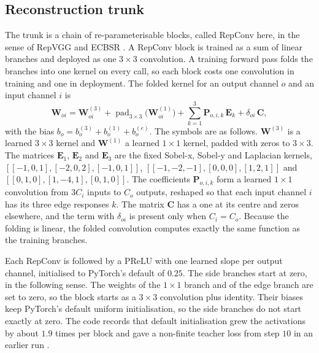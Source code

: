 \subsection{Reconstruction trunk}\label{sec:tsrm-trunk}

The trunk is a chain of re-parameterisable blocks, called RepConv here, in the sense of RepVGG \cite{ding2021repvgg} and ECBSR \cite{zhang2021ecbsr}. A RepConv block is trained as a sum of linear branches and deployed as one $3\times3$ convolution. A training forward pass folds the branches into one kernel on every call, so each block costs one convolution in training and one in deployment. The folded kernel for an output channel $o$ and an input channel $i$ is
\begin{equation}\label{eq:tsrm-fold}
\mathbf{W}_{oi}=\mathbf{W}^{(3)}_{oi}+\operatorname{pad}_{3\times3}\big(\mathbf{W}^{(1)}_{oi}\big)+\sum_{k=1}^{3}\mathbf{P}_{o,i,k}\,\mathbf{E}_k+\delta_{oi}\,\mathbf{C},
\end{equation}
with the bias $b_o=b^{(3)}_o+b^{(1)}_o+b^{(e)}_o$. The symbols are as follows. $\mathbf{W}^{(3)}$ is a learned $3\times3$ kernel and $\mathbf{W}^{(1)}$ a learned $1\times1$ kernel, padded with zeros to $3\times3$. The matrices $\mathbf{E}_1$, $\mathbf{E}_2$ and $\mathbf{E}_3$ are the fixed Sobel-x, Sobel-y and Laplacian kernels, $[[-1,0,1],[-2,0,2],[-1,0,1]]$, $[[-1,-2,-1],[0,0,0],[1,2,1]]$ and $[[0,1,0],[1,-4,1],[0,1,0]]$. The coefficients $\mathbf{P}_{o,i,k}$ form a learned $1\times1$ convolution from $3C_i$ inputs to $C_o$ outputs, reshaped so that each input channel $i$ has its three edge responses $k$. The matrix $\mathbf{C}$ has a one at its centre and zeros elsewhere, and the term with $\delta_{oi}$ is present only when $C_i=C_o$. Because the folding is linear, the folded convolution computes exactly the same function as the training branches.

Each RepConv is followed by a PReLU with one learned slope per output channel, initialised to PyTorch's default of $0.25$. The side branches start at zero, in the following sense. The weights of the $1\times1$ branch and of the edge branch are set to zero, so the block starts as a $3\times3$ convolution plus identity. Their biases keep PyTorch's default uniform initialisation, so the side branches do not start exactly at zero. The code records that default initialisation grew the activations by about $1.9$ times per block and gave a non-finite teacher loss from step $10$ in an earlier run \Observation.

